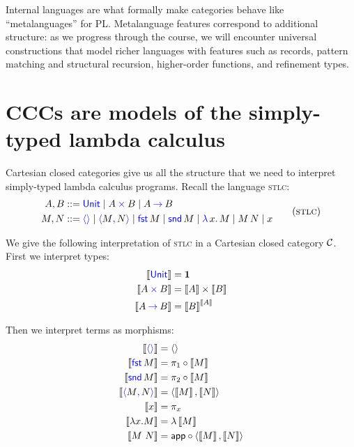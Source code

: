 Internal languages are what formally make categories behave like ``metalanguages''
for PL. Metalanguage features correspond to additional structure:
as we progress through the course, we will encounter universal constructions
that model richer languages with features such as records, pattern matching and structural recursion,
higher-order functions, and refinement types.

\section{CCCs are models of the simply-typed lambda calculus}
Cartesian closed categories give us all the structure that we need to interpret
simply-typed lambda calculus programs. Recall the language \textsc{stlc}:
\begin{gather}
  \begin{aligned}
   A,B &::= \plkw{Unit}
     \mid A \pltimes B
     \mid A \plto B
  \\
  M,N &::= \plunit{}
      \mid \plpair{M}{N}
      \mid \plfst{M}
      \mid \plsnd{M}
      \mid \pllam{x}{M}
      \mid \plapp{M}{N}
      \mid x
  \end{aligned}
  \tag{\textsc{stlc}}
\end{gather}

We give the following interpretation of \textsc{stlc} 
in a Cartesian closed category $\mathcal C$. 
First we interpret types:
\begin{align*}
  \left\llbracket \mathsf{{\color{blue}Unit}} \right\rrbracket &= \mathbf{1} \\ 
  \left\llbracket A \mathbin{{\color{blue}\times}} B \right\rrbracket &= \left\llbracket A \right\rrbracket \times \left\llbracket B \right\rrbracket \\ 
  \left\llbracket A \mathbin{{\color{blue}\to}} B \right\rrbracket &= \left\llbracket B \right\rrbracket^{\left\llbracket A \right\rrbracket}
\end{align*}

Then we interpret terms as morphisms:
    \begin{align*}
    \llbr{\plunit} &= \angled{} \\
    \llbr{\plfst{M}} &= \pi_1 \circ \llbr{M} \\
    \llbr{\plsnd{M}} &= \pi_2 \circ \llbr{M} \\
    \llbr{\plpair{M}{N}} &= \angled{\llbr{M},\llbr{N}} \\
    \llbr{x} &= \pi_x \\
    \llbr{\lambda x . M} &= \lambda \dbracket{M} \\ 
    \llbr{M~N} &= \app \circ \langle \dbracket{M}, \dbracket{N} \rangle
  \end{align*}

